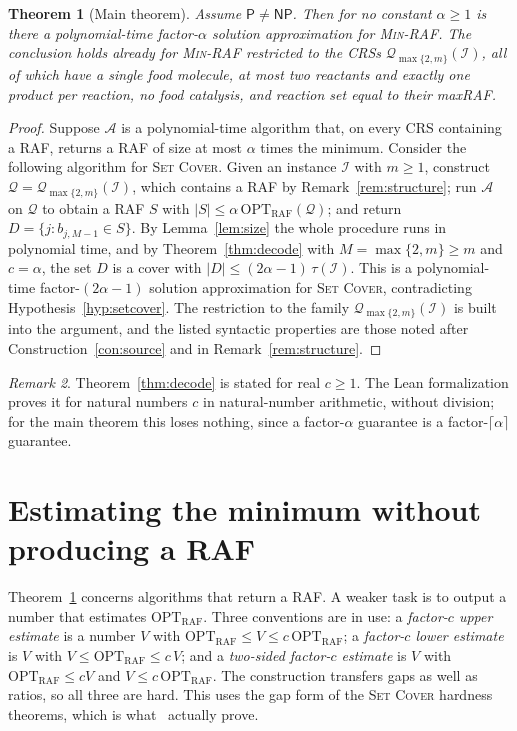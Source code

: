 \documentclass[11pt,a4paper]{article}
\theoremstyle{plain}
\newtheorem{theorem}{Theorem}[section]
\theoremstyle{definition}
\theoremstyle{remark}
\newtheorem{remark}[theorem]{Remark}
\newcommand{\OPT}{\mathrm{OPT}}
\newcommand{\RAF}{\mathrm{RAF}}
\newcommand{\optraf}{\OPT_{\RAF}}
\newcommand{\cQ}{\mathcal{Q}}
\newcommand{\cI}{\mathcal{I}}
\newcommand{\tauI}{\tau(\cI)}
\newcommand{\SetCover}{\textup{\textsc{Set Cover}}}
\newcommand{\MinRAF}{\textup{\textsc{Min-RAF}}}
\newcommand{\NP}{\mathsf{NP}}
\newcommand{\Ptime}{\mathsf{P}}
\begin{document}
\begin{theorem}[Main theorem]\label{thm:main}
Assume $\Ptime\ne\NP$. Then for no constant $\alpha\ge 1$ is there a polynomial-time factor-$\alpha$ solution approximation for \MinRAF. The conclusion holds already for \MinRAF{} restricted to the CRSs $\cQ_{\max\{2,m\}}(\cI)$, all of which have a single food molecule, at most two reactants and exactly one product per reaction, no food catalysis, and reaction set equal to their maxRAF.
\end{theorem}

\begin{proof}
Suppose $\mathcal{A}$ is a polynomial-time algorithm that, on every CRS containing a RAF, returns a RAF of size at most $\alpha$ times the minimum. Consider the following algorithm for \SetCover. Given an instance $\cI$ with $m\ge 1$, construct $\cQ=\cQ_{\max\{2,m\}}(\cI)$, which contains a RAF by Remark~\ref{rem:structure}; run $\mathcal{A}$ on $\cQ$ to obtain a RAF $S$ with $|S|\le\alpha\,\optraf(\cQ)$; and return $D=\{j:b_{j,M-1}\in S\}$. By Lemma~\ref{lem:size} the whole procedure runs in polynomial time, and by Theorem~\ref{thm:decode} with $M=\max\{2,m\}\ge m$ and $c=\alpha$, the set $D$ is a cover with $|D|\le(2\alpha-1)\,\tauI$. This is a polynomial-time factor-$(2\alpha-1)$ solution approximation for \SetCover, contradicting Hypothesis~\ref{hyp:setcover}. The restriction to the family $\cQ_{\max\{2,m\}}(\cI)$ is built into the argument, and the listed syntactic properties are those noted after Construction~\ref{con:source} and in Remark~\ref{rem:structure}.
\end{proof}

\begin{remark}\label{rem:realc}
Theorem~\ref{thm:decode} is stated for real $c\ge 1$. The Lean formalization proves it for natural numbers $c$ in natural-number arithmetic, without division; for the main theorem this loses nothing, since a factor-$\alpha$ guarantee is a factor-$\lceil\alpha\rceil$ guarantee.
\end{remark}

\section{Estimating the minimum without producing a RAF}\label{sec:gap}

Theorem~\ref{thm:main} concerns algorithms that return a RAF. A weaker task is to output a number that estimates $\optraf$. Three conventions are in use: a \emph{factor-$c$ upper estimate} is a number $V$ with $\optraf\le V\le c\,\optraf$; a \emph{factor-$c$ lower estimate} is $V$ with $V\le\optraf\le c\,V$; and a \emph{two-sided factor-$c$ estimate} is $V$ with $\optraf\le cV$ and $V\le c\,\optraf$. The construction transfers gaps as well as ratios, so all three are hard. This uses the gap form of the \SetCover{} hardness theorems, which is what~\cite{razsafra1997subconstant,feige1998threshold,dinur2014analytical} actually prove.
\end{document}

